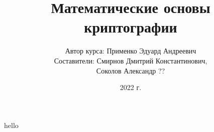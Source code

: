 \documentclass[a4paper,11pt]{book}
\title{Математические основы криптографии}
\author{Автор курса: Применко Эдуард Андреевич \\ 
		Составители: Смирнов Дмитрий Константинович, \\
					 Соколов Александр ??}
\date{2022 г.}
\begin{document}
\maketitle
\tableofcontents

\chapter{}

hello
\end{document}

